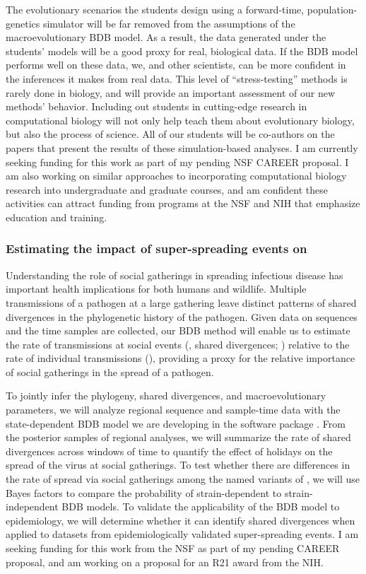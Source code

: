 The evolutionary scenarios the students design using
a forward-time, population-genetics simulator
will be far removed from the assumptions
of the macroevolutionary BDB model.
As a result, the data generated under the students' models will be a good proxy
for real, biological data.
If the BDB model performs well on these data, we, and other scientists, can be
more confident in the inferences it makes from real data.
This level of ``stress-testing'' methods is rarely done in biology, and will
provide an important assessment of our new methods' behavior.
Including out students in
cutting-edge research in computational biology will not only help
teach them about evolutionary biology, but also the process of science.
All of our students will be co-authors on the papers that present the results
of these simulation-based analyses.
I am currently seeking funding for this work as part of my pending NSF CAREER
proposal.
I am also working on similar approaches to incorporating computational
biology research into undergraduate and graduate courses, and am
confident these activities can attract funding from programs at the NSF and NIH
that emphasize education and training.


\subsubsection*{Estimating the impact of super-spreading events on \covid}
Understanding the role of social gatherings in spreading infectious disease
has important health implications for both humans and wildlife.
Multiple transmissions of a pathogen at a large gathering leave distinct
patterns of shared divergences in the phylogenetic history of the pathogen.
Given data on sequences and the time samples are collected, our BDB method will
enable us to estimate the rate of transmissions at social events (\ie, shared
divergences; \burstrate) relative to the rate of individual transmissions
(\speciationrate),
providing a proxy for the relative importance of social gatherings
in the spread of a pathogen.

To jointly infer the \sarscov phylogeny, shared divergences,
and macroevolutionary parameters,
we will analyze regional sequence and sample-time data with the
state-dependent BDB model we are developing in the software package \revbayes.
From the posterior samples of regional analyses, we will summarize the rate of
shared divergences across windows of time to quantify the effect of holidays
on the spread of the virus at social gatherings.
To test whether there are differences in the rate of spread via social
gatherings among the named variants of \sarscov,
we will use Bayes factors to compare the probability of strain-dependent to
strain-independent BDB models.
To validate the applicability of the BDB model to epidemiology,
we will determine whether it can identify shared divergences when applied to
\sarscov datasets from epidemiologically validated super-spreading events.
I am seeking funding for this work from the NSF as part of my pending CAREER
proposal, and am working on a proposal for an R21 award from the NIH.



